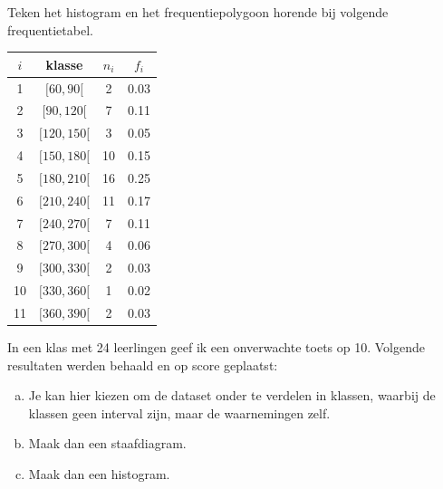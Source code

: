 \documentclass[12pt,twoside,a4paper]{article}
\begin{document}
\begin{oefening}
Teken het histogram en het frequentiepolygoon horende bij volgende frequentietabel.\\
\begin{center}
\begin{tabular}{c|c|c|c}
$i$ & klasse     & $n_i$ & $f_i$\\
\hline
  1 & $[ 60,  90[$ &   2 &  0.03\\
  2 & $[ 90, 120[$ &   7 &  0.11\\
  3 & $[120, 150[$ &   3 &  0.05\\
  4 & $[150, 180[$ &  10 &  0.15\\
  5 & $[180, 210[$ &  16 &  0.25\\
  6 & $[210, 240[$ &  11 &  0.17\\
  7 & $[240, 270[$ &   7 &  0.11\\
  8 & $[270, 300[$ &   4 &  0.06\\
  9 & $[300, 330[$ &   2 &  0.03\\
 10 & $[330, 360[$ &   1 &  0.02\\
 11 & $[360, 390[$ &   2 &  0.03\\
\end{tabular}
\end{center}
\end{oefening}

\begin{oefening}
In een klas met 24 leerlingen geef ik een onverwachte toets op 10. Volgende resultaten werden behaald en op score geplaatst:
\begin{center}
\end{center}
\begin{enumerate}[(a)]
\item Je kan hier kiezen om de dataset onder te verdelen in klassen, waarbij de klassen geen interval zijn, maar de waarnemingen zelf.
\item Maak dan een staafdiagram.
\item Maak dan een histogram.
\end{enumerate}
\end{oefening}
\end{document}
